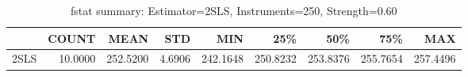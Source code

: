 \begin{table}[ht]
\centering
\caption{fstat summary: Estimator=2SLS, Instruments=250, Strength=0.60}
\begin{tabular}{lrrrrrrrr}
\toprule
 & COUNT & MEAN & STD & MIN & 25\% & 50\% & 75\% & MAX \\
\midrule
2SLS & 10.0000 & 252.5200 & 4.6906 & 242.1648 & 250.8232 & 253.8376 & 255.7654 & 257.4496 \\
\bottomrule
\end{tabular}
\end{table}
